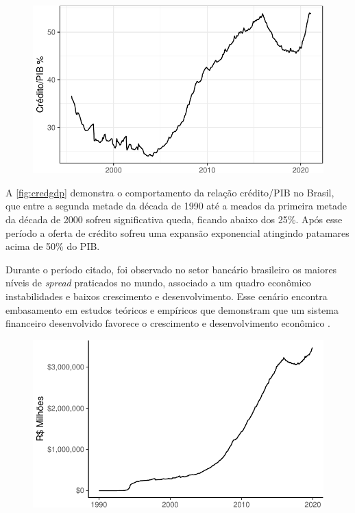 \documentclass[12pt,12pt,openright,oneside,a4paper,chapter=TITLE,section=TITLE,subsection=TITLE,subsubsection=TITLE english,french,spanish,portugues,sumario=tradicional]{abntex2}
\begin{document}
\begin{figure}

\begin{center}\includegraphics{12-exportedfigures/credit gdp-1} \end{center}
\label{fig:credgdp}
\end{figure}

A \autoref{fig:credgdp} demonstra o comportamento da relação crédito/PIB no
Brasil, que entre a segunda metade da década de 1990 até a meados da primeira
metade da década de 2000 sofreu significativa queda, ficando abaixo dos 25\%.
Após esse período a oferta de crédito sofreu uma expansão exponencial atingindo
patamares acima de 50\% do PIB.

Durante o período citado, foi observado no setor bancário brasileiro os maiores
níveis de \emph{spread} praticados no mundo, associado a um quadro econômico
instabilidades e baixos crescimento e desenvolvimento. Esse cenário encontra
embasamento em estudos teóricos e empíricos que demonstram que um sistema
financeiro desenvolvido favorece o crescimento e desenvolvimento econômico
\cite{levine:1997, matos:2003}.

\begin{figure}

\begin{center}\includegraphics{12-exportedfigures/balance credit-1} \end{center}
\label{fig:saldocredito}
\end{figure}
\end{document}
